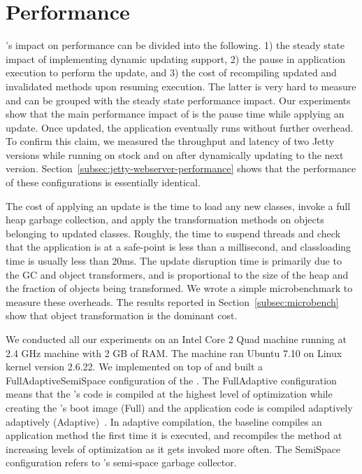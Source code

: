 \section{Performance}
\label{sec:performance}

\JV's impact on performance can be divided into the following. 1) the
steady state impact of implementing dynamic updating support, 2) the pause
in application execution to perform the update, and 3) the cost of
recompiling updated and invalidated methods upon resuming execution. The
latter is very hard to measure and can be grouped with the steady state
performance impact. Our experiments show that
the main performance impact of \JV is the pause time while applying an update. Once
updated, the application eventually runs without further overhead.  To
confirm this claim, we measured the throughput and latency of two 
Jetty versions while running on
stock \RVM and on \JV after dynamically updating to the next version.
Section~\ref{subsec:jetty-webserver-performance} shows that the performance of these
configurations is essentially identical.


The cost of applying an update is the time to load any new classes, invoke
a full heap garbage collection, and apply the transformation methods on
objects belonging to updated classes.  Roughly, the time to suspend threads
and check that the application is at a safe-point is less than a
millisecond, and classloading time is usually less than 20ms.
The update disruption time is primarily due to the GC and
object transformers, and is proportional to the size of the heap and the
fraction of objects being transformed.  We wrote a simple microbenchmark to
measure these overheads.  The results reported in
Section~\ref{subsec:microbench} show that object transformation
is the dominant cost.

We conducted all our experiments on an Intel Core 2 Quad machine running at
2.4 GHz machine with 2 GB of RAM.  The machine ran Ubuntu 7.10 on Linux
kernel version 2.6.22. We implemented \JV on top of \RVMversion and built a
FullAdaptiveSemiSpace configuration of the \VM. The FullAdaptive
configuration means that the \VM's code is compiled at the highest level of
optimization while creating the \VM's boot image (Full) and the application
code is compiled adaptively adaptively (Adaptive)~\cite{AAB+:00}. In
adaptive compilation, the \VM baseline compiles an application method the
first time it is executed, and recompiles the method at increasing levels
of optimization as it gets invoked more often.  The SemiSpace configuration
refers to \RVM's semi-space garbage collector.
